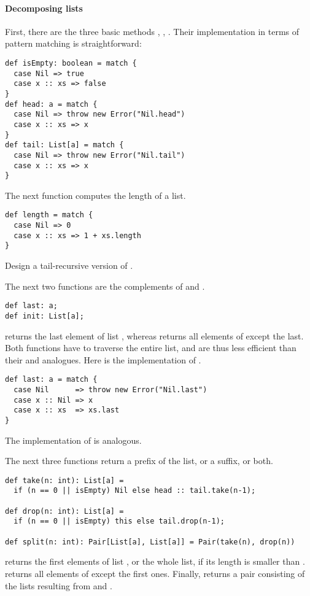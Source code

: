 \paragraph{Decomposing lists}
First, there are the three basic methods ,
, . Their implementation in terms of pattern
matching is straightforward:
\begin{lstlisting}
def isEmpty: boolean = match {
  case Nil => true
  case x :: xs => false 
}   
def head: a = match { 
  case Nil => throw new Error("Nil.head") 
  case x :: xs => x 
}
def tail: List[a] = match { 
  case Nil => throw new Error("Nil.tail") 
  case x :: xs => x 
}
\end{lstlisting}

The next function computes the length of a list.
\begin{lstlisting}
def length = match {
  case Nil => 0
  case x :: xs => 1 + xs.length
}
\end{lstlisting}
\begin{exercise} Design a tail-recursive version of .
\end{exercise}

The next two functions are the complements of  and
.
\begin{lstlisting}
def last: a;
def init: List[a];
\end{lstlisting}
 returns the last element of list , whereas
 returns all elements of  except the last.
Both functions have to traverse the entire list, and are thus less
efficient than their  and  analogues.
Here is the implementation of .
\begin{lstlisting}
def last: a = match {
  case Nil      => throw new Error("Nil.last")
  case x :: Nil => x
  case x :: xs  => xs.last
}
\end{lstlisting}
The implementation of  is analogous.

The next three functions return a prefix of the list, or a suffix, or
both.
\begin{lstlisting}
def take(n: int): List[a] = 
  if (n == 0 || isEmpty) Nil else head :: tail.take(n-1);

def drop(n: int): List[a] = 
  if (n == 0 || isEmpty) this else tail.drop(n-1);

def split(n: int): Pair[List[a], List[a]] = Pair(take(n), drop(n))
\end{lstlisting}
 returns the first  elements of list
, or the whole list, if its length is smaller than .
 returns all elements of  except the
 first ones. Finally,  returns a pair
consisting of the lists resulting from  and
.

